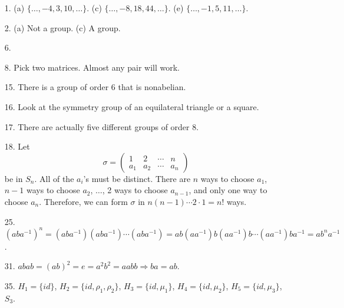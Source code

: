  
{\small
\begin{itemize}
 
\item[1.]
(a) $\{ \ldots, -4, 3, 10, \ldots \}$.
(c) $\{ \ldots, -8, 18, 44, \ldots \}$.
(e) $\{ \ldots, -1, 5, 11, \ldots \}$.
 
\item[2.]
(a) Not a group.
(c) A group.
 
 
 
\item[6.] 
 
 
\item[8.]
Pick two matrices. Almost any pair will work.
 
\item[15.]
There is a group of order 6 that is nonabelian.
 
\item[16.]
Look at the symmetry group of an equilateral triangle or a square.
 
\item[17.]
There are actually five different groups of order 8.
 
\item[18.]
Let
\[
\sigma
=
\begin{pmatrix}
1   & 2   & \cdots & n \\
a_1 & a_2 & \cdots & a_n
\end{pmatrix}
\]
be in $S_n$. All of the $a_i$'s must be distinct.  There are $n$ ways
to choose $a_1$, $n-1$ ways to choose $a_2$, $\ldots$, 2 ways to
choose $a_{n-1}$, and only one way to choose $a_n$. Therefore, we can form
$\sigma$ in $n(n-1) \cdots 2 \cdot 1 = n!$ ways.
 
\item[25.]
$(aba^{-1})^n = (aba^{-1})(aba^{-1}) \cdots (aba^{-1}) 
= ab(aa^{-1})b(aa^{-1})b \cdots (aa^{-1})ba^{-1} = ab^na^{-1}$.
 
\item[31.]
$abab = (ab)^2 = e = a^2 b^2 = aabb\Rightarrow  ba = ab$.
 
\item[35.]
$H_1 = \{ id \}$, $H_2 = \{ id, \rho_1, \rho_2  \}$, $H_3 = \{ id,
\mu_1 \}$, $H_4 = \{ id, \mu_2 \}$, $H_5 = \{ id, \mu_3 \}$, $S_3$.
 

\end{itemize}}
